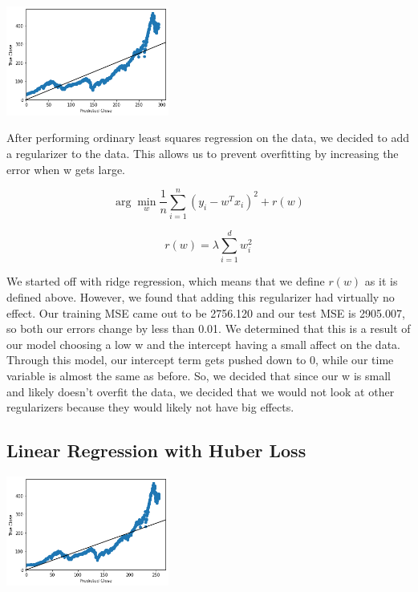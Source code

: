 \documentclass[final,5p,times,twocolumn,authoryear, 12pt]{elsarticle}
\begin{document}
\includegraphics[width=0.4\textwidth, angle=0]{linregRR.png}

After performing ordinary least squares regression on the data, we decided to add a regularizer to the data. This allows us to prevent overfitting by increasing the error when w gets large.


\begin{adjustwidth}{1cm}{}
    \[ \arg \min_w \frac{1}{n} \sum_{i = 1}^{n} (y_i - w^T x_i)^2 + r(w)\]
\end{adjustwidth}

\begin{adjustwidth}{2.1cm}{}
        \[r(w) = \lambda\sum_{i=1}^d w_i^2\]

\end{adjustwidth}

We started off with ridge regression, which means that we define $r(w)$ as it is defined above. However, we found that adding this regularizer had virtually no effect. Our training MSE came out to be 2756.120 and our test MSE is 2905.007, so both our errors change by less than 0.01. We determined that this is a result of our model choosing a low w and the intercept having a small affect on the data. Through this model, our intercept term gets pushed down to 0, while our time variable is almost the same as before. So, we decided that since our w is small and likely doesn't overfit the data, we decided that we would not look at other regularizers because they would likely not have big effects.

\subsection{Linear Regression with Huber Loss}

\includegraphics[width=0.4\textwidth, angle=0]{linregHuber.png}
\end{document}

